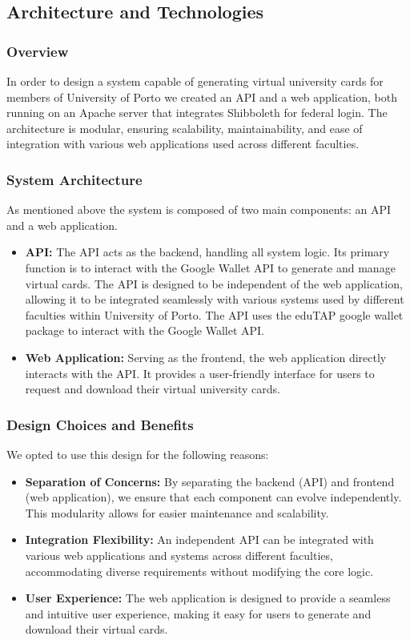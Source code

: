 \documentclass[12pt]{article}
\begin{document}
\subsection{Architecture and Technologies}

\subsubsection{Overview}
In order to design a system capable of generating virtual university cards for members of University of Porto we created an API and a web application, both running on an Apache\cite{apache} server that integrates Shibboleth\cite{shibboleth} for federal login. The architecture is modular, ensuring scalability, maintainability, and ease of integration with various web applications used across different faculties.

\subsubsection{System Architecture}

As mentioned above the system is composed of two main components: an API and a web application.
\begin{itemize}
	\item \textbf{API:} The API acts as the backend, handling all system logic. Its primary function is to interact with the Google Wallet API to generate and manage virtual cards. The API is designed to be independent of the web application, allowing it to be integrated seamlessly with various systems used by different faculties within University of Porto. The API uses the eduTAP google wallet package\cite{edutap-pkg} to interact with the Google Wallet API.
	\item \textbf{Web Application:} Serving as the frontend, the web application directly interacts with the API. It provides a user-friendly interface for users to request and download their virtual university cards.
\end{itemize}

\subsubsection{Design Choices and Benefits}
We opted to use this design for the following reasons:
\begin{itemize}
	\item \textbf{Separation of Concerns:} By separating the backend (API) and frontend (web application), we ensure that each component can evolve independently. This modularity allows for easier maintenance and scalability.
	\item \textbf{Integration Flexibility:} An independent API can be integrated with various web applications and systems across different faculties, accommodating diverse requirements without modifying the core logic.
	\item \textbf{User Experience:} The web application is designed to provide a seamless and intuitive user experience, making it easy for users to generate and download their virtual cards.
\end{itemize}
\end{document}

